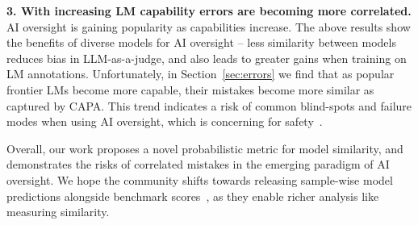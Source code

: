 \textbf{3. With increasing LM capability errors are becoming more correlated.} AI oversight is gaining popularity as capabilities increase. The above results show the benefits of diverse models for AI oversight -- less similarity between models reduces bias in LLM-as-a-judge, and also leads to greater gains when training on LM annotations. Unfortunately, in Section~\ref{sec:errors} we find that as popular frontier LMs become more capable, their mistakes become more similar as captured by CAPA. This trend indicates a risk of common blind-spots and failure modes when using AI oversight, which is concerning for safety~\citep{kenton2024scalableoversightweakllms}.

Overall, our work proposes a novel probabilistic metric for model similarity, and demonstrates the risks of correlated mistakes in the emerging paradigm of AI oversight. We hope the community shifts towards releasing sample-wise model predictions alongside benchmark scores~\citep{burnell2023reporting, ghosh2024onebench}, as they enable richer analysis like measuring similarity.

